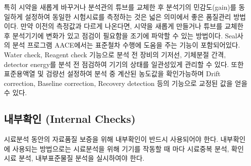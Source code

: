 \documentclass[
]{book}
\begin{document}
특히 시약을 새롭게 바꾸거나 분석관의 튜브를 교체한 후 분석기의 민감도(gain)를 동일하게 설정하여 동일한 시험시료를 측정하는 것은 넓은 의미에서 좋은 품질관리 방법이다. 만약 이전의 측정값과 다르게 나온다면, 시약을 새롭게 만들거나 튜브를 교체한 후 분석기기에 변화가 있고 점검이 필요함을 조기에 파악할 수 있는 방법이다.
Seal사의 분석 프로그램 AACE에서는 표준철차 수행에 도움을 주는 기능이 포함되어있다. Water check, Reagent check 기능으로 분석 전 장비의 기저선, 기체분절 간격, detector energy를 분석 전 점검하여 기기의 상태를 일관성있게 관리할 수 있다. 또한 표준용액열 및 검량선 설정하여 분석 중 계산된 농도값을 확인가능하며 Drift correction, Baseline correction, Recovery detection 등의 기능으로 교정된 값을 얻을 수 있다.

\hypertarget{uxb0b4uxbd80uxd655uxc778-internal-checks}{%
\subsection{내부확인 (Internal Checks)}\label{uxb0b4uxbd80uxd655uxc778-internal-checks}}

시료분석 동안의 자료품질 보증을 위해 내부확인이 반드시 사용되어야 한다. 내부확인에 사용되는 방법으로는 시료분석을 위해 기기를 작동할 때 마다 시료중복 분석, 확인시료 분석, 내부표준물질 분석을 실시하여야 한다.
\end{document}
